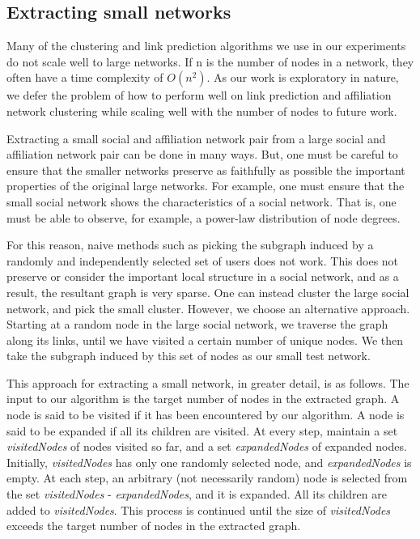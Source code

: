 \documentclass{report}
\begin{document}
\subsection{Extracting small networks}
Many of the clustering and link prediction algorithms we use in our experiments do not scale well to large networks. If n is the number of nodes in a network, they often have a time complexity of $O(n^{2})$. As our work is exploratory in nature, we defer the problem of how to perform well on link prediction and affiliation network clustering while scaling well with the number of nodes to future work.

Extracting a small social and affiliation network pair from a large social and affiliation network pair can be done in many ways. But, one must be careful to ensure that the smaller networks preserve as faithfully as possible the important properties of the original large networks. For example, one must ensure that the small social network shows the characteristics of a social network. That is, one must be able to observe, for example, a power-law distribution of node degrees.

For this reason, naive methods such as picking the subgraph induced by a randomly and independently selected set of users does not work. This does not preserve or consider the important local structure in a social network, and as a result, the resultant graph is very sparse. One can instead cluster the large social network, and pick the small cluster. However, we choose an alternative approach. Starting at a random node in the large social network, we traverse the graph along its links, until we have visited a certain number of unique nodes. We then take the subgraph induced by this set of nodes as our small test network.

This approach for extracting a small network, in greater detail, is as follows. The input to our algorithm is the target number of nodes in the extracted graph. A node is said to be visited if it has been encountered by our algorithm. A node is said to be expanded if all its children are visited. At every step, maintain a set \textit{visitedNodes} of nodes visited so far, and a set \textit{expandedNodes} of expanded nodes. Initially, \textit{visitedNodes} has only one randomly selected node, and \textit{expandedNodes} is empty. At each step, an arbitrary (not necessarily random) node is selected from the set \textit{visitedNodes} - \textit{expandedNodes}, and it is expanded. All its children are added to \textit{visitedNodes}. This process is continued until the size of \textit{visitedNodes} exceeds the target number of nodes in the extracted graph.
\end{document}
